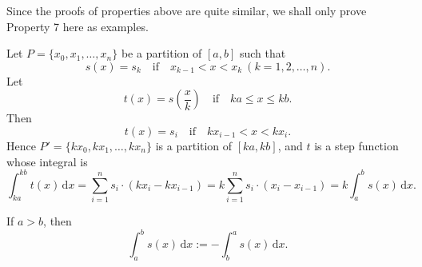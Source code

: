 	\begin{remarkenv}
		Since the proofs of properties above are quite similar, we shall only prove Property 7 here as examples.
	\end{remarkenv}
	\begin{proofenv}
	Let \( P = \{x_0, x_1, \ldots, x_n\} \) be a partition of \([a, b]\) such that
	\[
	s(x) = s_k \quad \text{if}\quad x_{k-1} < x < x_k\ (k = 1, 2, \ldots, n). 
	\]
	Let \[ t(x) = s\left(\frac x k\right) \quad  \text{if}\quad  ka \le x \le kb. \]  
	Then \[ t(x) = s_i \quad \text{if} \quad k x_{i-1} < x< k x_i.\]
	Hence \( P' = \{k x_0, k x_1, \ldots, k x_n\} \) is a partition of \([ka, kb]\), and \(t\) is a step function whose integral is  
	\[
	\int_{ka}^{kb} t(x) \, \mathrm{d}x
	= \sum_{i=1}^{n} s_i \cdot (k x_i - k x_{i-1})
	= k \sum_{i=1}^{n} s_i \cdot (x_i - x_{i-1})
	= k \int_a^b s(x) \, \mathrm{d}x.
	\]		
	\end{proofenv}
	\begin{definitionenv}
		If $a>b$, then
		\[
		\int_a^b s(x) \, \mathrm{d}x := -\int_b^a s(x)\, \mathrm{d}x.
		\]
	\end{definitionenv}
